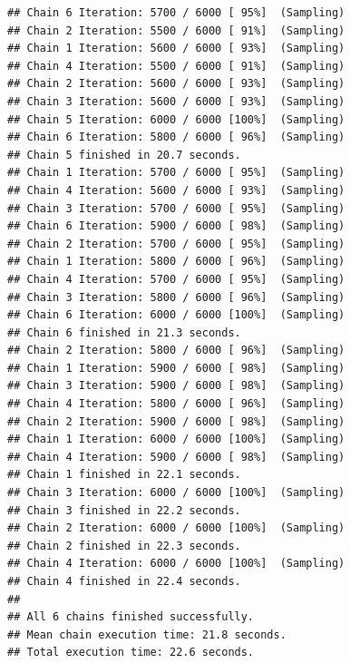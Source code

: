 \documentclass[
]{article}
\newenvironment{Shaded}{\begin{snugshade}}{\end{snugshade}}
\newcommand{\FunctionTok}[1]{\textcolor[rgb]{0.13,0.29,0.53}{\textbf{#1}}}
\newcommand{\NormalTok}[1]{#1}
\newcommand{\SpecialCharTok}[1]{\textcolor[rgb]{0.81,0.36,0.00}{\textbf{#1}}}
\newcommand{\StringTok}[1]{\textcolor[rgb]{0.31,0.60,0.02}{#1}}
\begin{document}
\begin{verbatim}
## Chain 6 Iteration: 5700 / 6000 [ 95%]  (Sampling) 
## Chain 2 Iteration: 5500 / 6000 [ 91%]  (Sampling) 
## Chain 1 Iteration: 5600 / 6000 [ 93%]  (Sampling) 
## Chain 4 Iteration: 5500 / 6000 [ 91%]  (Sampling) 
## Chain 2 Iteration: 5600 / 6000 [ 93%]  (Sampling) 
## Chain 3 Iteration: 5600 / 6000 [ 93%]  (Sampling) 
## Chain 5 Iteration: 6000 / 6000 [100%]  (Sampling) 
## Chain 6 Iteration: 5800 / 6000 [ 96%]  (Sampling) 
## Chain 5 finished in 20.7 seconds.
## Chain 1 Iteration: 5700 / 6000 [ 95%]  (Sampling) 
## Chain 4 Iteration: 5600 / 6000 [ 93%]  (Sampling) 
## Chain 3 Iteration: 5700 / 6000 [ 95%]  (Sampling) 
## Chain 6 Iteration: 5900 / 6000 [ 98%]  (Sampling) 
## Chain 2 Iteration: 5700 / 6000 [ 95%]  (Sampling) 
## Chain 1 Iteration: 5800 / 6000 [ 96%]  (Sampling) 
## Chain 4 Iteration: 5700 / 6000 [ 95%]  (Sampling) 
## Chain 3 Iteration: 5800 / 6000 [ 96%]  (Sampling) 
## Chain 6 Iteration: 6000 / 6000 [100%]  (Sampling) 
## Chain 6 finished in 21.3 seconds.
## Chain 2 Iteration: 5800 / 6000 [ 96%]  (Sampling) 
## Chain 1 Iteration: 5900 / 6000 [ 98%]  (Sampling) 
## Chain 3 Iteration: 5900 / 6000 [ 98%]  (Sampling) 
## Chain 4 Iteration: 5800 / 6000 [ 96%]  (Sampling) 
## Chain 2 Iteration: 5900 / 6000 [ 98%]  (Sampling) 
## Chain 1 Iteration: 6000 / 6000 [100%]  (Sampling) 
## Chain 4 Iteration: 5900 / 6000 [ 98%]  (Sampling) 
## Chain 1 finished in 22.1 seconds.
## Chain 3 Iteration: 6000 / 6000 [100%]  (Sampling) 
## Chain 3 finished in 22.2 seconds.
## Chain 2 Iteration: 6000 / 6000 [100%]  (Sampling) 
## Chain 2 finished in 22.3 seconds.
## Chain 4 Iteration: 6000 / 6000 [100%]  (Sampling) 
## Chain 4 finished in 22.4 seconds.
## 
## All 6 chains finished successfully.
## Mean chain execution time: 21.8 seconds.
## Total execution time: 22.6 seconds.
\end{verbatim}

\begin{Shaded}
\end{Shaded}
\end{document}
